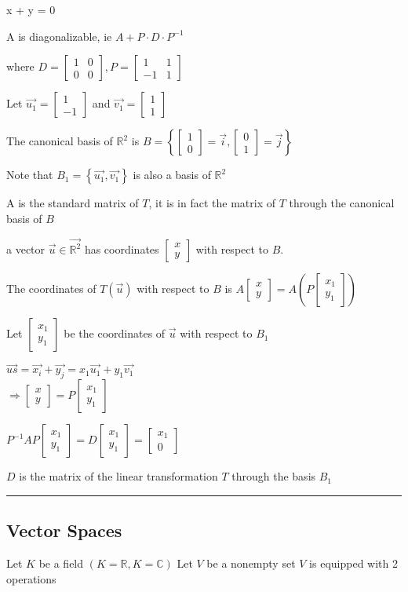 \documentclass[12pt]{article}
\renewcommand{\v}[1]{\overrightarrow{#1}}
\newcommand\m[1]{\begin{bmatrix}#1\end{bmatrix}}
\newcommand{\real}[0]{\mathbb{R}}
\newcommand{\complex}[0]{\mathbb{C}}
\newcommand{\bb}[1]{\left\{#1\right\}}
\newcommand{\pp}[1]{\left(#1\right)}
\newcommand{\divider}[0]{\par\textcolor{lightgray}{\rule{\textwidth}{0.1pt}}}
\begin{document}
	x + y = 0
	
	A is diagonalizable, ie \(A + P \cdot D \cdot P^{-1}\)
	
	where \(D = \m{1 & 0 \\ 0 & 0}, P = \m{1 & 1 \\ -1 & 1}\)
	
	Let \(\v{u_1} = \m{1 \\ -1}\) and \(\v{v_1} = \m{1 \\ 1}\)
	
	The canonical basis of \(\real^2\) is \(B = \bb{\m{1 \\ 0} = \v{i}, \m{0 \\ 1} = \v{j}}\)
	
	Note that \(B_1 = \bb{\v{u_1}, \v{v_1}}\) is also a basis of \(\real^2\)
	
	A is the standard matrix of \(T\), it is in fact the matrix of \(T\) through the canonical basis of \(B\)
	
	a vector \(\v{u} \in \v{\real^2}\) has coordinates \(\m{x \\ y}\) with respect to \(B\).
	
	The coordinates of \(T(\v{u})\) with respect to \(B\) is \(A \m{x \\ y} = A\pp{P \m{x_1 \\ y_1}}\) 
	
	Let \(\m{x_1 \\ y_1}\) be the coordinates of \(\v{u}\) with respect to \(B_1\)
	
	\(\v{us} = \v{x_i} + \v{y_j} = x_1 \v{u_1} + y_1 \v{v_1}\) \\
	\(\Rightarrow \m{x \\ y} = P \m{x_1 \\ y_1}\)
	
	\(P^{-1}AP \m{x_1 \\ y_1} = D \m{x_1 \\ y_1} = \m{x_1 \\ 0}\)
	
	\(D\) is the matrix of the linear transformation \(T\) through the basis \(B_1\)
	
	\divider
	
	\subsection{Vector Spaces}
	
	Let \(K\) be a field \(\pp{K = \real, K = \complex}\)
	Let \(V\) be a nonempty set
	\(V\) is equipped with 2 operations
	
\end{document}
